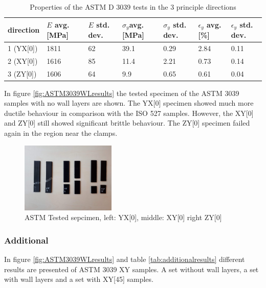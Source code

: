 \begin{table}[b]
\centering
\caption{Properties of the ASTM D 3039 tests in the 3 principle directions}  
\label{tab:ASTM3039results}
\begin{tabular}{ p{1.5cm}p{1cm}p{1cm}p{1cm}p{1cm}p{1cm}p{1cm}  }
\hline
direction & $E$ avg. [MPa] & $E$ std. dev. & $\sigma_y$avg. [MPa] & $\sigma_y$ std. dev. & $\epsilon_y$ avg. [\%] & $\epsilon_y$   std. dev. \\
 \hline
1 (YX[0]) & 1811 & 62 & 39.1 & 0.29 & 2.84 & 0.11 \\
2 (XY[0]) & 1616 & 85 & 11.4 & 2.21 & 0.73 & 0.14 \\
3 (ZY[0]) & 1606 & 64 & 9.9 & 0.65 & 0.61 & 0.04\\
 \hline
\end{tabular}
\end{table}

In figure \ref{fig:ASTM3039WLresults} the tested specimen of the ASTM 3039 samples with no wall layers are shown. The YX[0] specimen showed much more ductile behaviour in comparison with the ISO 527 samples. However, the XY[0] and ZY[0] still showed significant brittle behaviour. The ZY[0] specimen failed again in the region near the clamps.

\begin{figure}[htb]
    \centering
    \includegraphics[width=0.40\textwidth]{chapter_5_Experimentaltesting/figures/ImageASTM.jpg}
    \caption{ASTM Tested sepcimen, left: YX[0], middle: XY[0] right ZY[0]}
    \label{fig:ASTM3039specimen}
\end{figure}

\subsubsection{Additional} 
In figure \ref{fig:ASTM3039WLresults} and table \ref{tab:additionalresults} different results are presented of ASTM 3039 XY samples. A set without wall layers, a set with wall layers and a set with XY[45] samples.

